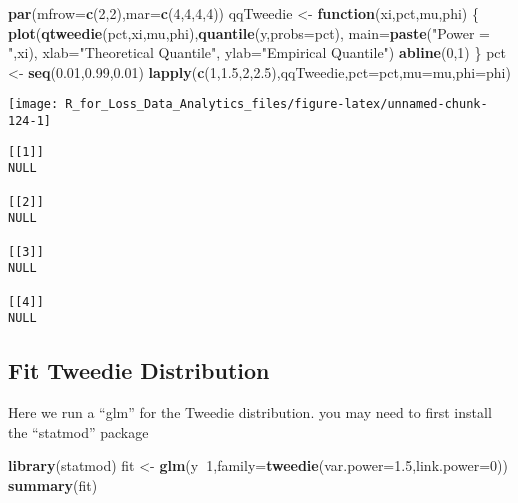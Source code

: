 \documentclass[]{book}
\newenvironment{Shaded}{\begin{snugshade}}{\end{snugshade}}
\newcommand{\KeywordTok}[1]{\textcolor[rgb]{0.13,0.29,0.53}{\textbf{#1}}}
\newcommand{\DataTypeTok}[1]{\textcolor[rgb]{0.13,0.29,0.53}{#1}}
\newcommand{\DecValTok}[1]{\textcolor[rgb]{0.00,0.00,0.81}{#1}}
\newcommand{\FloatTok}[1]{\textcolor[rgb]{0.00,0.00,0.81}{#1}}
\newcommand{\StringTok}[1]{\textcolor[rgb]{0.31,0.60,0.02}{#1}}
\newcommand{\ControlFlowTok}[1]{\textcolor[rgb]{0.13,0.29,0.53}{\textbf{#1}}}
\newcommand{\OperatorTok}[1]{\textcolor[rgb]{0.81,0.36,0.00}{\textbf{#1}}}
\newcommand{\NormalTok}[1]{#1}
\theoremstyle{definition}
\theoremstyle{definition}
\theoremstyle{definition}
\theoremstyle{remark}
\begin{document}
\begin{Shaded}
\begin{Highlighting}[]
\KeywordTok{par}\NormalTok{(}\DataTypeTok{mfrow=}\KeywordTok{c}\NormalTok{(}\DecValTok{2}\NormalTok{,}\DecValTok{2}\NormalTok{),}\DataTypeTok{mar=}\KeywordTok{c}\NormalTok{(}\DecValTok{4}\NormalTok{,}\DecValTok{4}\NormalTok{,}\DecValTok{4}\NormalTok{,}\DecValTok{4}\NormalTok{))}
\NormalTok{qqTweedie <-}\StringTok{ }\ControlFlowTok{function}\NormalTok{(xi,pct,mu,phi) \{}
  \KeywordTok{plot}\NormalTok{(}\KeywordTok{qtweedie}\NormalTok{(pct,xi,mu,phi),}\KeywordTok{quantile}\NormalTok{(y,}\DataTypeTok{probs=}\NormalTok{pct),}
       \DataTypeTok{main=}\KeywordTok{paste}\NormalTok{(}\StringTok{"Power = "}\NormalTok{,xi), }\DataTypeTok{xlab=}\StringTok{"Theoretical Quantile"}\NormalTok{, }\DataTypeTok{ylab=}\StringTok{"Empirical Quantile"}\NormalTok{)}
  \KeywordTok{abline}\NormalTok{(}\DecValTok{0}\NormalTok{,}\DecValTok{1}\NormalTok{)}
\NormalTok{\}}
\NormalTok{pct <-}\StringTok{ }\KeywordTok{seq}\NormalTok{(}\FloatTok{0.01}\NormalTok{,}\FloatTok{0.99}\NormalTok{,}\FloatTok{0.01}\NormalTok{)}
\KeywordTok{lapply}\NormalTok{(}\KeywordTok{c}\NormalTok{(}\DecValTok{1}\NormalTok{,}\FloatTok{1.5}\NormalTok{,}\DecValTok{2}\NormalTok{,}\FloatTok{2.5}\NormalTok{),qqTweedie,}\DataTypeTok{pct=}\NormalTok{pct,}\DataTypeTok{mu=}\NormalTok{mu,}\DataTypeTok{phi=}\NormalTok{phi)}
\end{Highlighting}
\end{Shaded}

\begin{center}\texttt{[image: R\_for\_Loss\_Data\_Analytics\_files/figure-latex/unnamed-chunk-124-1]} \end{center}

\begin{verbatim}
[[1]]
NULL

[[2]]
NULL

[[3]]
NULL

[[4]]
NULL
\end{verbatim}

\subsection{Fit Tweedie Distribution}\label{fit-tweedie-distribution}

Here we run a ``glm'' for the Tweedie distribution. you may need to
first install the ``statmod'' package

\begin{Shaded}
\begin{Highlighting}[]
\KeywordTok{library}\NormalTok{(statmod)}
\NormalTok{fit <-}\StringTok{ }\KeywordTok{glm}\NormalTok{(y}\OperatorTok{~}\DecValTok{1}\NormalTok{,}\DataTypeTok{family=}\KeywordTok{tweedie}\NormalTok{(}\DataTypeTok{var.power=}\FloatTok{1.5}\NormalTok{,}\DataTypeTok{link.power=}\DecValTok{0}\NormalTok{))}
\KeywordTok{summary}\NormalTok{(fit)}
\end{Highlighting}
\end{Shaded}
\end{document}
